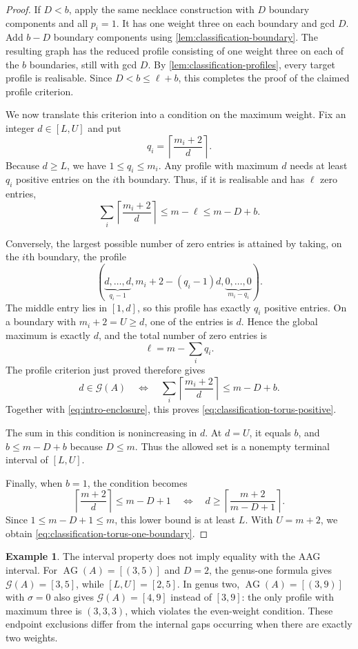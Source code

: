 \documentclass[11pt]{amsart}
\theoremstyle{definition}
\theoremstyle{plain}
\theoremstyle{definition}
\newtheorem{example}[example]{Example}
\theoremstyle{definition}
\newcommand{\AG}{\operatorname{AG}}
\newcommand{\GSpec}{\mathcal G}
\begin{document}
\begin{proof}
If $D<b$, apply the same necklace construction with
$D$ boundary components and all $p_i=1$.
It has one weight three on each boundary and gcd $D$.
Add $b-D$ boundary components using
\cref{lem:classification-boundary}.
The resulting graph has the reduced profile
consisting of one weight three on each of the $b$
boundaries, still with gcd $D$.
By \cref{lem:classification-profiles}, every target
profile is realisable.
Since $D<b\leq\ell+b$, this completes the proof of
the claimed profile criterion.

We now translate this criterion into a condition
on the maximum weight.
Fix an integer $d\in[L,U]$ and put
\[
 q_i=\left\lceil\frac{m_i+2}{d}\right\rceil.
\]
Because $d\geq L$, we have $1\leq q_i\leq m_i$.
Any profile with maximum $d$ needs at least $q_i$
positive entries on the $i$th boundary.
Thus, if it is realisable and has $\ell$ zero entries,
\begin{equation}
\label{eq:classification-positive-slots}
 \sum_i\left\lceil\frac{m_i+2}{d}\right\rceil
 \leq m-\ell
 \leq m-D+b.
\end{equation}

Conversely, the largest possible number of zero
entries is attained by taking, on the $i$th boundary,
the profile
\[
 \left(
  \underbrace{d,\ldots,d}_{q_i-1},
  m_i+2-(q_i-1)d,
  \underbrace{0,\ldots,0}_{m_i-q_i}
 \right).
\]
The middle entry lies in $[1,d]$, so this profile
has exactly $q_i$ positive entries.
On a boundary with $m_i+2=U\geq d$, one of the
entries is $d$.
Hence the global maximum is exactly $d$, and the
total number of zero entries is
\[
 \ell=m-\sum_iq_i.
\]
The profile criterion just proved therefore gives
\[
 d\in\GSpec(A)
 \quad\Longleftrightarrow\quad
 \sum_i\left\lceil\frac{m_i+2}{d}\right\rceil
 \leq m-D+b.
\]
Together with \eqref{eq:intro-enclosure}, this proves
\eqref{eq:classification-torus-positive}.

The sum in this condition is nonincreasing in $d$.
At $d=U$, it equals $b$, and
$b\leq m-D+b$ because $D\leq m$.
Thus the allowed set is a nonempty terminal interval
of $[L,U]$.

Finally, when $b=1$, the condition becomes
\[
 \left\lceil\frac{m+2}{d}\right\rceil
 \leq m-D+1
 \quad\Longleftrightarrow\quad
 d\geq
 \left\lceil\frac{m+2}{m-D+1}\right\rceil.
\]
Since $1\leq m-D+1\leq m$, this lower bound is at
least $L$.
With $U=m+2$, we obtain
\eqref{eq:classification-torus-one-boundary}.
\end{proof}
\begin{example}
\label{ex:classification-interval-endpoints}
The interval property does not imply equality with the AAG interval.
For $\AG(A)=[(3,5)]$ and $D=2$, the genus-one formula gives
$\GSpec(A)=[3,5]$, while $[L,U]=[2,5]$.
In genus two, $\AG(A)=[(3,9)]$ with $\sigma=0$ also gives
$\GSpec(A)=[4,9]$ instead of $[3,9]$: the only profile with maximum
three is $(3,3,3)$, which violates the even-weight condition.
These endpoint exclusions differ from the internal gaps occurring
when there are exactly two weights.
\end{example}
\end{document}
